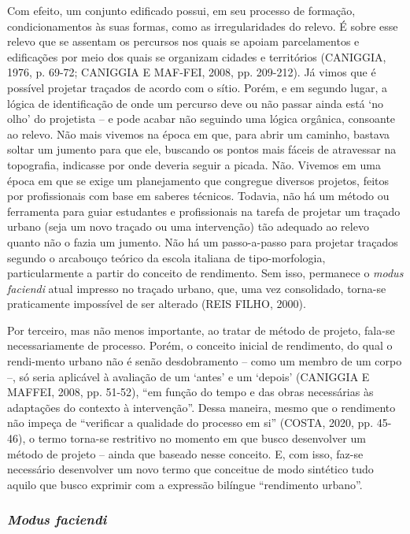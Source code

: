 \documentclass[twoside, 12pt, english,italian,latin,greek,french,spanish,brazil]{book}
\begin{document}
        Com efeito, um conjunto edificado possui, em seu processo de formação, condicionamentos às suas formas, como as irregularidades do relevo. É sobre esse relevo que se assentam os percursos nos quais se apoiam parcelamentos e edificações por meio dos quais se organizam cidades e territórios (CANIGGIA, 1976, p. 69-72; CANIGGIA E MAF-FEI, 2008, pp. 209-212). Já vimos que é possível projetar traçados de acordo com o sítio. Porém, e em segundo lugar, a lógica de identificação de onde um percurso deve ou não passar ainda está ‘no olho’ do projetista – e pode acabar não seguindo uma lógica orgânica, consoante ao relevo. Não mais vivemos na época em que, para abrir um caminho, bastava soltar um jumento para que ele, buscando os pontos mais fáceis de atravessar na topografia, indicasse por onde deveria seguir a picada. Não. Vivemos em uma época em que se exige um planejamento que congregue diversos projetos, feitos por profissionais com base em saberes técnicos. Todavia, não há um método ou ferramenta para guiar estudantes e profissionais na tarefa de projetar um traçado urbano (seja um novo traçado ou uma intervenção) tão adequado ao relevo quanto não o fazia um jumento. Não há um passo-a-passo para projetar traçados segundo o arcabouço teórico da escola italiana de tipo-morfologia, particularmente a partir do conceito de rendimento. Sem isso, permanece o \textit{modus faciendi} atual impresso no traçado urbano, que, uma vez consolidado, torna-se praticamente impossível de ser alterado (REIS FILHO, 2000). 

        Por terceiro, mas não menos importante, ao tratar de método de projeto, fala-se necessariamente de processo. Porém, o conceito inicial de rendimento, do qual o rendi-mento urbano não é senão desdobramento – como um membro de um corpo –, só seria aplicável à avaliação de um ‘antes’ e um ‘depois’ (CANIGGIA E MAFFEI, 2008, pp. 51-52), “em função do tempo e das obras necessárias às adaptações do contexto à intervenção”. Dessa maneira, mesmo que o rendimento não impeça de “verificar a qualidade do processo em si” (COSTA, 2020, pp. 45-46), o termo torna-se restritivo no momento em que busco desenvolver um método de projeto – ainda que baseado nesse conceito. E, com isso, faz-se necessário desenvolver um novo termo que conceitue de modo sintético tudo aquilo que busco exprimir com a expressão bilíngue “rendimento urbano”.

    \subsubsection{\textit{Modus faciendi}}
\end{document}
